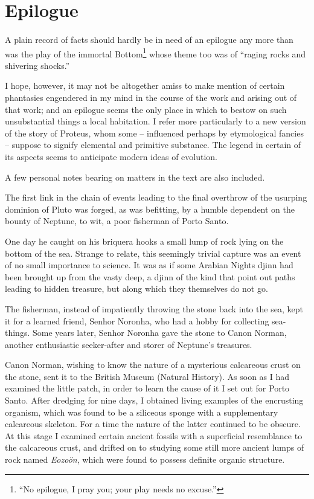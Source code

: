 \documentclass[a4paper, 12pt, oneside]{article}
\begin{document}
\section{Epilogue}
\paragraph{}
A plain record of facts should hardly be in need of an epilogue any more than was the play of the immortal Bottom\footnote{``No epilogue, I pray you; your play needs no excuse.''} whose theme too was of ``raging rocks and shivering shocks.''

I hope, however, it may not be altogether amiss to make mention of certain phantasies engendered in my mind in the course of the work and arising out of that work; and an epilogue seems the only place in which to bestow on such unsubstantial things a local habitation. I refer more particularly to a new version of the story of Proteus, whom some -- influenced perhaps by etymological fancies -- suppose to signify elemental and primitive substance. The legend in certain of its aspects seems to anticipate modern ideas of evolution.

A few personal notes bearing on matters in the text are also included.

The first link in the chain of events leading to the final overthrow of the usurping dominion of Pluto was forged, as was befitting, by a humble dependent on the bounty of Neptune, to wit, a poor fisherman of Porto Santo.

One day he caught on his briquera hooks a small lump of rock lying on the bottom of the sea. Strange to relate, this seemingly trivial capture was an event of no small importance to science. It was as if some Arabian Nights djinn had been brought up from the vasty deep, a djinn of the kind that point out paths leading to hidden treasure, but along which they themselves do not go.

The fisherman, instead of impatiently throwing the stone back into the sea, kept it for a learned friend, Senhor Noronha, who had a hobby for collecting sea-things. Some years later, Senhor Noronha gave the stone to Canon Norman, another enthusiastic seeker-after and storer of Neptune's treasures.

Canon Norman, wishing to know the nature of a mysterious calcareous crust on the stone, sent it to the British Museum (Natural History). As soon as I had examined the little patch, in order to learn the cause of it I set out for Porto Santo. After dredging for nine days, I obtained living examples of the encrusting organism, which was found to be a siliceous sponge with a supplementary calcareous skeleton. For a time the nature of the latter continued to be obscure. At this stage I examined certain ancient fossils with a superficial resemblance to the calcareous crust, and drifted on to studying some still more ancient lumps of rock named \emph{Eozoön}, which were found to possess definite organic structure.
\end{document}
